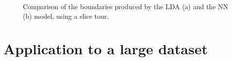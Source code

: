 \documentclass[
  letterpaper,
]{krantz}
\begin{document}
\begin{figure}

\begin{minipage}{0.50\linewidth}



\end{minipage}%
%
\begin{minipage}{0.50\linewidth}



\end{minipage}%

\caption{\label{fig-penguins-lda-nn}Comparison of the boundaries
produced by the LDA (a) and the NN (b) model, using a slice tour.}

\end{figure}%


\section{Application to a large
dataset}\label{application-to-a-large-dataset}
\end{document}
